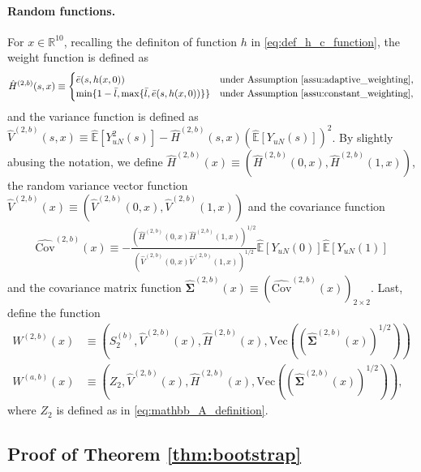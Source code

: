 \documentclass[12pt]{article}
\newcommand{\E}{\mathbb E}								%
\begin{document}
\paragraph{Random functions.} For $x\in\mathbb{R}^{10}$, recalling the definiton of function $h$ in \eqref{eq:def_h_c_function}, the weight function is defined as
\begin{align*}
	\hat{H}^{(2,b)}(s,x)\equiv 
	\begin{cases}
		\bar e(s, h(x,0)) & \text{under Assumption \ref{assu:adaptive_weighting}},\\
		\min\{1-\bar l,\max\{\bar l,\bar e(s, h(x, 0))\}\}& \text{under Assumption \ref{assu:constant_weighting}},
	\end{cases}
\end{align*}
and the variance function is defined as $\hat{V}^{(2,b)}(s,x)\equiv \hat{\E}[Y_{uN}^2(s)]-\hat{H}^{(2,b)}(s,x)(\hat{\E}[Y_{uN}(s)])^2$. By slightly abusing the notation, we define $\hat{H}^{(2,b)}(x)\equiv (\hat{H}^{(2,b)}(0,x),\hat{H}^{(2,b)}(1,x))$, the random variance vector function $\hat{V}^{(2,b)}(x)\equiv (\hat{V}^{(2,b)}(0,x),\hat{V}^{(2,b)}(1,x))$ and the covariance function 
\begin{align*}
	\hat{\mathrm{Cov}}^{(2,b)}(x)\equiv -\frac{(\hat{H}^{(2,b)}(0,x)\hat{H}^{(2,b)}(1,x))^{1/2}}{(\hat{V}^{(2,b)}(0,x)\hat{V}^{(2,b)}(1,x))^{1/2}}\hat{\E}[Y_{uN}(0)]\hat{\E}[Y_{uN}(1)]
\end{align*}
and the covariance matrix function $\hat{\bm \Sigma}^{(2,b)}(x)\equiv (\hat{\mathrm{Cov}}^{(2,b)}(x))_{2\times 2}$. Last, define the function 
\begin{align*}
	W^{(2,b)}(x)
	&
	\equiv \left(S_2^{(b)},\hat{V}^{(2,b)}(x),\hat{H}^{(2,b)}(x),\mathrm{Vec}((\hat{\bm \Sigma}^{(2,b)}(x))^{1/2})\right)\\
	W^{(a,b)}(x)
	&
	\equiv \left(Z_2,\hat{V}^{(2,b)}(x),\hat{H}^{(2,b)}(x),\mathrm{Vec}((\hat{\bm \Sigma}^{(2,b)}(x))^{1/2})\right),
\end{align*}
where $Z_2$ is defined as in \eqref{eq:mathbb_A_definition}.


\subsection{Proof of Theorem \ref{thm:bootstrap}}
\end{document}
